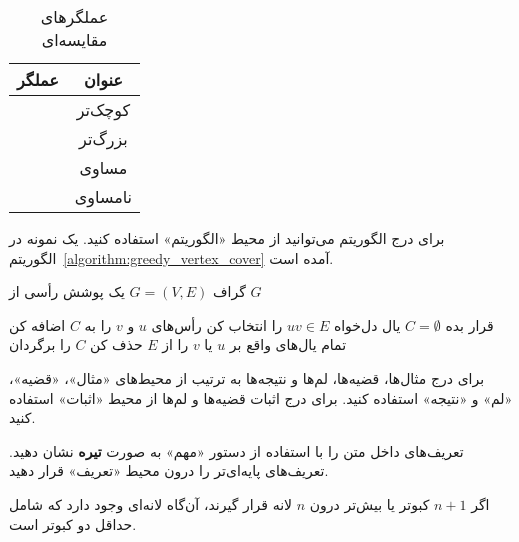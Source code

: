 \vspace{1.5em}

\begin{table}[ht]
\centering
\caption{عملگرهای مقایسه‌ای}

\begin{tabular}{|c|c|}
\hline 
\bf عملگر & \bf عنوان \\ 
\hline \hline 
\lr{\tt{<}} & کوچک‌تر \\ 
\lr{\tt{>}} & بزرگ‌تر \\
\lr{\tt{==}} &  مساوی \\ 
\lr{\tt{<>}} & نامساوی \\ 
\hline
\end{tabular}

\label{table:comparative_operators}
\end{table}

برای درج الگوریتم می‌توانید از محیط «الگوریتم» استفاده کنید.
یک نمونه در الگوریتم~\ref{algorithm:greedy_vertex_cover} آمده است.

\begin{algorithm}
\label{algorithm:greedy_vertex_cover}
\begin{algorithmic}[1]
\Require گراف $G=(V, E)$
\Ensure یک پوشش رأسی از $G$

\State قرار بده $C = \emptyset$  %
\State یال دل‌‌خواه $uv \in E$ را انتخاب کن
\State رأس‌های $u$ و $v$ را به $C$ اضافه کن
\State تمام یال‌های واقع بر $u$ یا $v$ را از $E$ حذف کن
\EndWhile
\State $C$ را برگردان
\end{algorithmic}
\end{algorithm}

برای درج مثال‌ها، قضیه‌ها، لم‌ها و نتیجه‌ها به ترتیب از محیط‌های
«مثال»، «قضیه»، «لم» و «نتیجه» استفاده کنید.
برای درج اثبات قضیه‌ها و لم‌ها  از محیط «اثبات» استفاده کنید.

تعریف‌های داخل متن را با استفاده از دستور «مهم» به صورت \textbf{تیره‌} نشان دهید.
تعریف‌های پایه‌ای‌تر را درون محیط «تعریف» قرار دهید.

\begin{تعریف}
اگر $n+1$ کبوتر یا بیش‌تر درون  $n$ لانه قرار گیرند، آن‌گاه لانه‌ای 
وجود دارد که شامل حداقل دو کبوتر است.
\end{تعریف}
